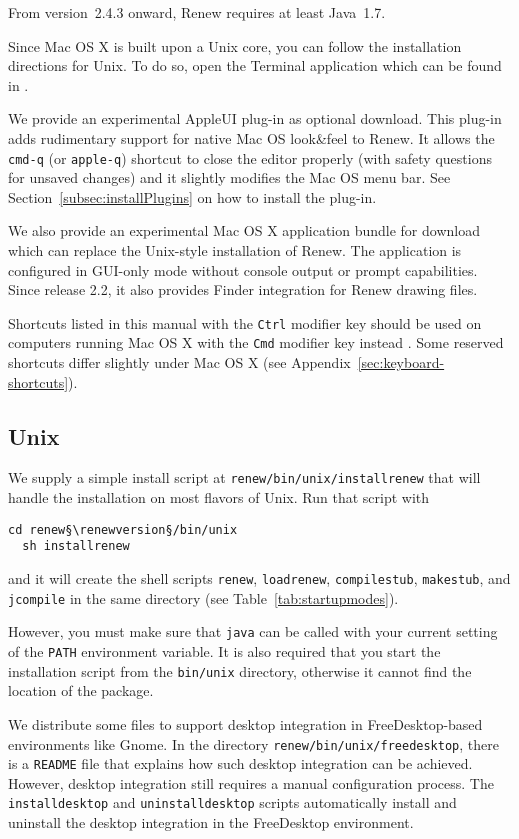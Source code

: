From version~2.4.3 onward, Renew requires at least Java~1.7.

Since Mac OS X is built upon a Unix core, 
you can follow the installation directions for Unix.
To do so, open the Terminal application which can be found in
.

We provide an experimental AppleUI
plug-in as optional download.
This plug-in adds rudimentary support for native Mac OS look\&feel to
Renew.
It allows the \texttt{cmd-q} (or \texttt{apple-q}) shortcut to close the
editor properly (with safety questions for unsaved changes) and it
slightly modifies the Mac OS menu bar.
See Section~\ref{subsec:installPlugins} on how to install the plug-in.

We also provide an experimental Mac OS X
application bundle for download which can replace the Unix-style
installation of Renew.
The application is configured in GUI-only mode without console
output or prompt capabilities.
Since release 2.2, it also provides Finder integration for Renew
drawing files.

Shortcuts listed in this manual with the \texttt{Ctrl} modifier key should be
used on computers running Mac OS X with the \texttt{Cmd} modifier key
instead .
Some reserved shortcuts differ slightly under Mac OS X (see Appendix~\ref{sec:keyboard-shortcuts}).

\subsection{Unix}

We supply a simple install script
at \texttt{renew\renewversion/bin/unix/installrenew}
that will handle the installation on most flavors of Unix.
Run that script with
\begin{lstlisting}[style=xnonfloating]
  cd renew§\renewversion§/bin/unix
  sh installrenew
\end{lstlisting}
and it will create the shell scripts
\texttt{renew}, \texttt{loadrenew}, \texttt{compilestub}, \texttt{makestub},
and \texttt{jcompile}
in the same directory (see Table~\ref{tab:startupmodes}).

However, you must make sure that \texttt{java} can be
called with your current setting of the \texttt{PATH}
environment variable. It is also required that you start
the installation script from the \texttt{bin/unix} directory,
otherwise it cannot find the location of the package.

We distribute some files to support desktop integration in
FreeDesktop-based environments like Gnome.
In the directory \texttt{renew\renewversion/bin/unix/freedesktop},
there is a \texttt{README} file that explains how such desktop integration
can be achieved.
However, desktop integration still requires a manual configuration
process. The \texttt{installdesktop} and \texttt{uninstalldesktop} scripts automatically install and uninstall the desktop integration in the FreeDesktop environment.

